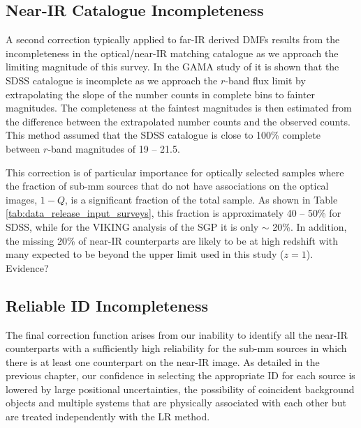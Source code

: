 \subsection{Near-IR Catalogue Incompleteness}

A second correction typically applied to far-IR derived DMFs results from the incompleteness in the optical/near-IR matching catalogue as we approach the limiting magnitude of this survey. In the GAMA study of \citealt{Dunne_2011} it is shown that the SDSS catalogue is incomplete as we approach the $r$-band flux limit by extrapolating the slope of the number counts in complete bins to fainter magnitudes. The completeness at the faintest magnitudes is then estimated from the difference between the extrapolated number counts and the observed counts. This method assumed that the SDSS catalogue is close to 100\% complete between $r$-band magnitudes of 19 -- 21.5. 

This correction is of particular importance for optically selected samples where the fraction of sub-mm sources that do not have associations on the optical images, $1 - Q$, is a significant fraction of the total sample. As shown in Table \ref{tab:data_release_input_surveys}, this fraction is approximately 40 -- 50\% for SDSS, while for the VIKING analysis of the SGP it is only $\sim$ 20\%. In addition, the missing 20\% of near-IR counterparts are likely to be at high redshift with many expected to be beyond the upper limit used in this study ($z = 1$). {\color{red} Evidence?}

\subsection{Reliable ID Incompleteness}

The final correction function arises from our inability to identify all the near-IR counterparts with a sufficiently high reliability for the sub-mm sources in which there is at least one counterpart on the near-IR image. As detailed in the previous chapter, our confidence in selecting the appropriate ID for each source is lowered by large positional uncertainties, the possibility of coincident background objects and multiple systems that are physically associated with each other but are treated independently with the LR method.

